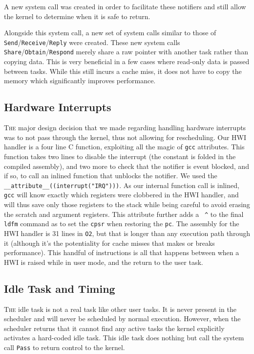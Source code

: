 \documentclass{article}
\begin{document}
A new system call was created in order to facilitate these notifiers and still
allow the kernel to determine when it is safe to return.

Alongside this system call, a new set of system calls similar to those of
\texttt{Send}/\texttt{Receive}/\texttt{Reply} were created. These new system
calls \texttt{Share}/\texttt{Obtain}/\texttt{Respond} merely share a raw pointer
with another task rather than copying data. This is very beneficial in a few
cases where read-only data is passed between tasks. While this still incurs a
cache miss, it does not have to copy the memory which significantly improves
performance.

\subsection*{Hardware Interrupts}

\textsc{The} major design decision that we made regarding handling hardware
interrupts was to not pass through the kernel, thus not allowing for
rescheduling. Our HWI handler is a four line C function, exploiting all the
magic of \texttt{gcc} attributes. This function takes two lines to disable the
interrupt (the constant is folded in the compiled assembly), and two more to
check that the notifier is event blocked, and if so, to call an inlined function
that unblocks the notifier. We used the
\texttt{\_\_attribute\_\_((interrupt("IRQ")))}. As our internal function call is
inlined, \texttt{gcc} will know exactly which registers were clobbered in the
HWI handler, and will thus save only those registers to the stack while being
careful to avoid erasing the scratch and argument registers. This attribute
further adds a~ \texttt{\^} to the final \texttt{ldfm} command as to set the
\texttt{cpsr} when restoring the \texttt{pc}. The assembly for the HWI handler
is 31 lines in \texttt{O2}, but that is longer than any execution path through
it (although it's the potentiality for cache misses that makes or breaks
performance). This handful of instructions is all that happens between when a
HWI is raised while in user mode, and the return to the user task.

\subsection*{Idle Task and Timing}

\textsc{The} idle task is not a real task like other user tasks. It is never
present in the scheduler and will never be scheduled by normal execution.
However, when the scheduler returns that it cannot find any active tasks the
kernel explicitly activates a hard-coded idle task. This idle task does nothing
but call the system call \texttt{Pass} to return control to the kernel.
\end{document}
